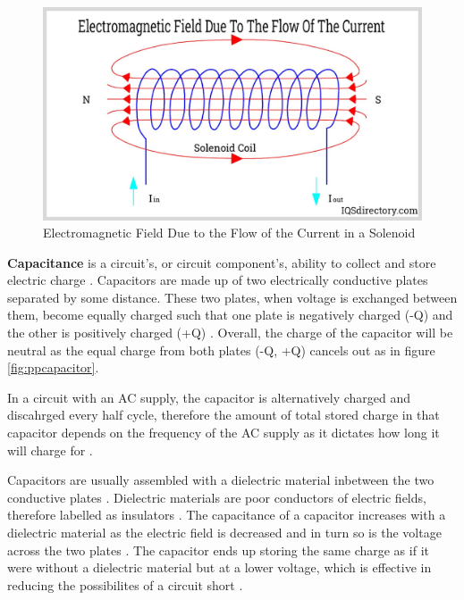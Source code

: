 \documentclass[12pt]{article}
\begin{document}
\begin{figure}[H]
    \includegraphics[width=15cm]{solenoid.jpg}
    \centering
    \caption{\centering \footnotesize{Electromagnetic Field Due to the Flow of the Current in a Solenoid \cite{solenoidpic}}}
    \label{fig:solenoid}
\end{figure}

\textbf{Capacitance} is a circuit's, or circuit component's, ability to collect and store electric charge
\cite{flukecapacitance}.
Capacitors are made up of two electrically conductive plates separated by some distance. These two plates, when voltage is exchanged between them,
become equally charged such that one plate is negatively charged (-Q) and the other is positively charged (+Q)
\cite{britcapacitance,librecapacitance}.
Overall, the charge of the capacitor will be neutral as the equal charge from both plates (-Q, +Q) cancels out
\cite{librecapacitance} as in figure \ref{fig:ppcapacitor}.

In a circuit with an AC supply, the capacitor is alternatively charged and discahrged every half cycle, therefore the amount of total
stored charge in that capacitor depends on the frequency of the AC supply as it dictates how long it will charge for
\cite{britcapacitance}.

Capacitors are usually assembled with a dielectric material inbetween the two conductive plates
\cite{britcapacitance,flukecapacitance,librecapacitance}.
Dielectric materials are poor conductors of electric fields, therefore labelled as insulators 
\cite{britdielectric}.
The capacitance of a capacitor increases with a dielectric material as the electric field is decreased and in turn so is the voltage across the two plates
\cite{hyperdielectric}.
The capacitor ends up storing the same charge as if it were without a dielectric material but at a lower voltage, which is effective in reducing the possibilites of a circuit short
\cite{hyperdielectric}.
\end{document}
